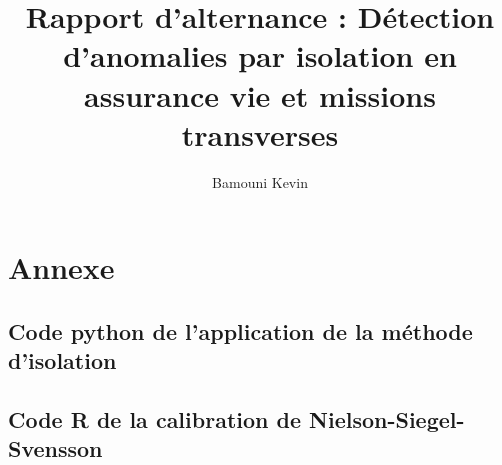 \documentclass[12pt,a4paper]{report}
\author{Bamouni Kevin}
\title{Rapport d'alternance : Détection d'anomalies par isolation en assurance vie et missions transverses}
\begin{document}
\maketitle





\setcounter{page}{1} %







{\setlength{\baselineskip}{0.9\baselineskip}
\par}


\setcounter{page}{1} 









\chapter*{Annexe}

\section*{Code python de l'application de la méthode d'isolation}



\section*{Code R de la calibration de Nielson-Siegel-Svensson}



{\setlength{\baselineskip}{0.9\baselineskip}
\setcounter{tocdepth}{5} %
\tableofcontents %
\par}

\listoffigures

\listoftables



\cite{ManfredGilli2010}
\cite{Liu2012}
\cite{Hull2015}
\cite{STORN1997}
\cite{Befec-PriceWaterhouse1996}
\\
\end{document}
